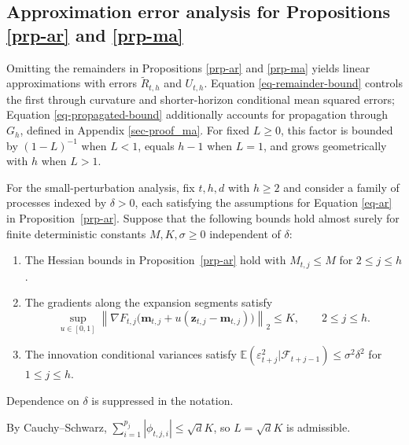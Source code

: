 \documentclass[
  american,
  12pt]{article}
\providecommand{\tightlist}{%
  \setlength{\itemsep}{0pt}\setlength{\parskip}{0pt}}
\theoremstyle{plain}
\theoremstyle{plain}
\theoremstyle{remark}
\begin{document}
\subsection{\texorpdfstring{Approximation error analysis for
Propositions \ref{prp-ar} and
\ref{prp-ma}}{Approximation error analysis for Propositions  and }}\label{sec-approximation-errors}

Omitting the remainders in Propositions \ref{prp-ar} and \ref{prp-ma}
yields linear approximations with errors \(\widetilde R_{t,h}\) and
\(U_{t,h}\). Equation \eqref{eq-remainder-bound} controls the first
through curvature and shorter-horizon conditional mean squared errors;
Equation \eqref{eq-propagated-bound} additionally accounts for
propagation through \(G_h\), defined in Appendix \ref{sec-proof_ma}. For
fixed \(L\geq0\), this factor is bounded by \((1-L)^{-1}\) when \(L<1\),
equals \(h-1\) when \(L=1\), and grows geometrically with \(h\) when
\(L>1\).

For the small-perturbation analysis, fix \(t,h,d\) with \(h\geq2\) and
consider a family of processes indexed by \(\delta>0\), each satisfying
the assumptions for Equation \eqref{eq-ar} in Proposition~\ref{prp-ar}.
Suppose that the following bounds hold almost surely for finite
deterministic constants \(M,K,\sigma\geq0\) independent of \(\delta\):

\begin{enumerate}
\def\labelenumi{\arabic{enumi}.}
\tightlist
\item
  The Hessian bounds in Proposition~\ref{prp-ar} hold with
  \(M_{t,j}\leq M\) for \(2\leq j\leq h\).
\item
  The gradients along the expansion segments satisfy \[
  \sup_{u\in[0,1]}\left\|\nabla F_{t,j}\bigl(\bm m_{t,j}+u(\bm z_{t,j}-\bm m_{t,j})\bigr)\right\|_2\leq K,
  \qquad 2\leq j\leq h.
  \]
\item
  The innovation conditional variances satisfy
  \(\mathbb E(\varepsilon_{t+j}^2|\mathcal F_{t+j-1})\leq\sigma^2\delta^2\)
  for \(1\leq j\leq h\).
\end{enumerate}

\noindent Dependence on \(\delta\) is suppressed in the notation.

By Cauchy--Schwarz, \(\sum_{i=1}^{p_j}|\phi_{t,j,i}|\leq\sqrt d K\), so
\(L=\sqrt d K\) is admissible.
\end{document}
